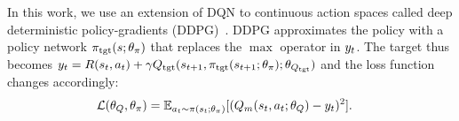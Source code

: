 In this work, we use an extension of DQN to continuous action spaces called
deep deterministic policy-gradients
(DDPG)~\citep{lillicrap2015continuous}. DDPG approximates the
policy with a policy network $\pi_{\text{tgt}}(s; \theta_\pi)$ that
replaces the $\max$
operator in $y_t$. The target thus becomes 
$ y_t = R(s_t, a_t) + \gamma
Q_{\text{tgt}}(s_{t+1}, \pi_{\text{tgt}}(s_{t+1}; \theta_\pi); \theta_{Q_{\text{tgt}}})$ and the
loss function changes accordingly:
%
\newcommand{\policytgt}{\policy_\text{tgt}}%
\begin{align}
  \mathcal{L}(\theta_Q, \theta_\pi) &= \mathbb{E}_{a_t \sim \pi(s_t; \theta_\pi)}[
                                      (Q_m(s_t, a_t; \theta_Q) - y_t)^2].
\end{align}
%



